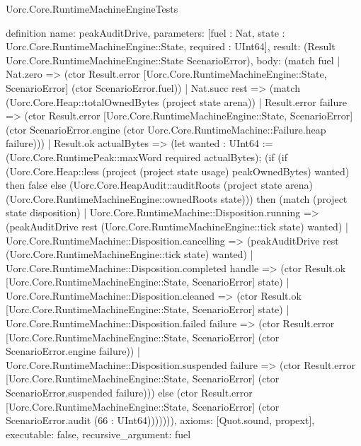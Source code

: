 \begin{lexlean}{Uorc.Core.RuntimeMachineEngineTests}
\begin{semanticmodule}
definition{
  name: peakAuditDrive,
  parameters: [fuel : Nat, state : Uorc.Core.RuntimeMachineEngine::State, required : UInt64],
  result: (Result Uorc.Core.RuntimeMachineEngine::State ScenarioError),
  body: (match fuel
    | Nat.zero => (ctor Result.error [Uorc.Core.RuntimeMachineEngine::State, ScenarioError] (ctor ScenarioError.fuel))
    | Nat.succ rest => (match (Uorc.Core.Heap::totalOwnedBytes (project state arena))
      | Result.error failure => (ctor Result.error [Uorc.Core.RuntimeMachineEngine::State, ScenarioError] (ctor ScenarioError.engine (ctor Uorc.Core.RuntimeMachine::Failure.heap failure)))
      | Result.ok actualBytes => (let wanted : UInt64 := (Uorc.Core.RuntimePeak::maxWord required actualBytes); (if (if (Uorc.Core.Heap::less (project (project state usage) peakOwnedBytes) wanted) then false else (Uorc.Core.HeapAudit::auditRoots (project state arena) (Uorc.Core.RuntimeMachineEngine::ownedRoots state))) then (match (project state disposition)
        | Uorc.Core.RuntimeMachine::Disposition.running => (peakAuditDrive rest (Uorc.Core.RuntimeMachineEngine::tick state) wanted)
        | Uorc.Core.RuntimeMachine::Disposition.cancelling => (peakAuditDrive rest (Uorc.Core.RuntimeMachineEngine::tick state) wanted)
        | Uorc.Core.RuntimeMachine::Disposition.completed handle => (ctor Result.ok [Uorc.Core.RuntimeMachineEngine::State, ScenarioError] state)
        | Uorc.Core.RuntimeMachine::Disposition.cleaned => (ctor Result.ok [Uorc.Core.RuntimeMachineEngine::State, ScenarioError] state)
        | Uorc.Core.RuntimeMachine::Disposition.failed failure => (ctor Result.error [Uorc.Core.RuntimeMachineEngine::State, ScenarioError] (ctor ScenarioError.engine failure))
        | Uorc.Core.RuntimeMachine::Disposition.suspended failure => (ctor Result.error [Uorc.Core.RuntimeMachineEngine::State, ScenarioError] (ctor ScenarioError.suspended failure))) else (ctor Result.error [Uorc.Core.RuntimeMachineEngine::State, ScenarioError] (ctor ScenarioError.audit (66 : UInt64))))))),
  axioms: [Quot.sound, propext],
  executable: false,
  recursive_argument: fuel
}


\end{semanticmodule}
\end{lexlean}
